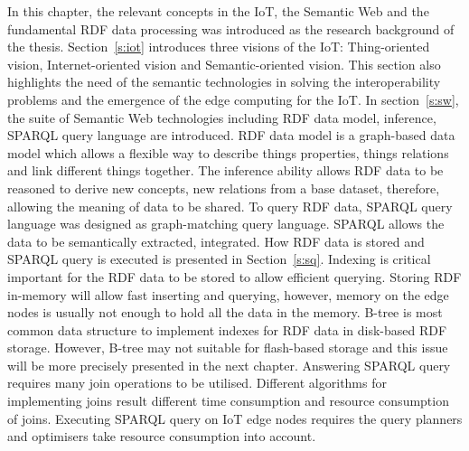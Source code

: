 {In this chapter, the relevant concepts in the IoT, the Semantic Web and the fundamental RDF data processing was introduced as the research background of the thesis.
Section~\ref{s:iot} introduces three visions of the IoT: Thing-oriented vision, Internet-oriented vision and Semantic-oriented vision.
This section also highlights the need of the semantic technologies in solving the interoperability problems and the emergence of the edge computing for the IoT. 
In section~\ref{s:sw}, the suite of Semantic Web technologies including RDF data model, inference, SPARQL query language are introduced.
RDF data model is a graph-based data model which allows a flexible way to describe things properties, things relations and link different things together.
The inference ability allows RDF data to be reasoned to derive new concepts, new relations from a base dataset, therefore, allowing the meaning of data to be shared.
To query RDF data, SPARQL query language was designed as graph-matching query language.
SPARQL allows the data to be semantically extracted, integrated.
How RDF data is stored and SPARQL query is executed is presented in Section~\ref{s:sq}.
Indexing is critical important for the RDF data to be stored to allow efficient querying.
Storing RDF in-memory will allow fast inserting and querying, however, memory on the edge nodes is usually not enough to hold all the data in the memory. 
B-tree is most common data structure to implement indexes for RDF data in disk-based RDF storage.
However, B-tree may not suitable for flash-based storage and this issue will be more precisely presented in the next chapter.
Answering SPARQL query requires many join operations to be utilised.
Different algorithms for implementing joins result different time consumption and resource consumption of joins.
Executing SPARQL query on IoT edge nodes requires the query planners and optimisers take resource consumption into account.
}









